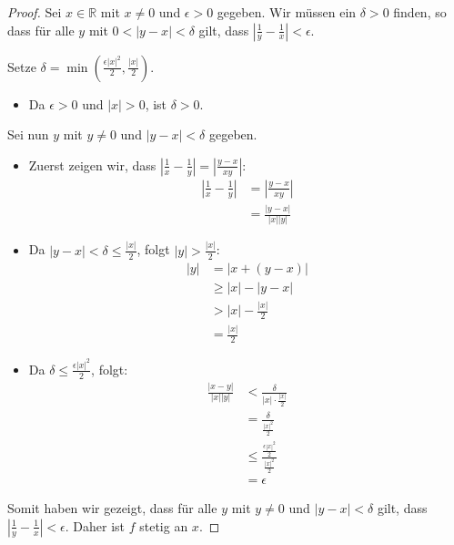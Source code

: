 \documentclass{article}
\begin{document}
\begin{proof}
Sei \( x \in \mathbb{R} \) mit \( x \neq 0 \) und \( \epsilon > 0 \) gegeben. Wir müssen ein \( \delta > 0 \) finden, so dass für alle \( y \) mit \( 0 < |y - x| < \delta \) gilt, dass \( \left| \frac{1}{y} - \frac{1}{x} \right| < \epsilon \).

Setze \( \delta = \min \left( \frac{\epsilon |x|^2}{2}, \frac{|x|}{2} \right) \).

\begin{itemize}
    \item Da \( \epsilon > 0 \) und \( |x| > 0 \), ist \( \delta > 0 \).
\end{itemize}

Sei nun \( y \) mit \( y \neq 0 \) und \( |y - x| < \delta \) gegeben.

\begin{itemize}
    \item Zuerst zeigen wir, dass \( \left| \frac{1}{x} - \frac{1}{y} \right| = \left| \frac{y - x}{xy} \right| \):
    \begin{align*}
    \left| \frac{1}{x} - \frac{1}{y} \right| &= \left| \frac{y - x}{xy} \right| \\
    &= \frac{|y - x|}{|x||y|}
    \end{align*}

    \item Da \( |y - x| < \delta \leq \frac{|x|}{2} \), folgt \( |y| > \frac{|x|}{2} \):
    \begin{align*}
    |y| &= |x + (y - x)| \\
    &\geq |x| - |y - x| \\
    &> |x| - \frac{|x|}{2} \\
    &= \frac{|x|}{2}
    \end{align*}

    \item Da \( \delta \leq \frac{\epsilon |x|^2}{2} \), folgt:
    \begin{align*}
    \frac{|x - y|}{|x||y|} &< \frac{\delta}{|x| \cdot \frac{|x|}{2}} \\
    &= \frac{\delta}{\frac{|x|^2}{2}} \\
    &\leq \frac{\frac{\epsilon |x|^2}{2}}{\frac{|x|^2}{2}} \\
    &= \epsilon
    \end{align*}
\end{itemize}

Somit haben wir gezeigt, dass für alle \( y \) mit \( y \neq 0 \) und \( |y - x| < \delta \) gilt, dass \( \left| \frac{1}{y} - \frac{1}{x} \right| < \epsilon \). Daher ist \( f \) stetig an \( x \).
\end{proof}
\end{document}
